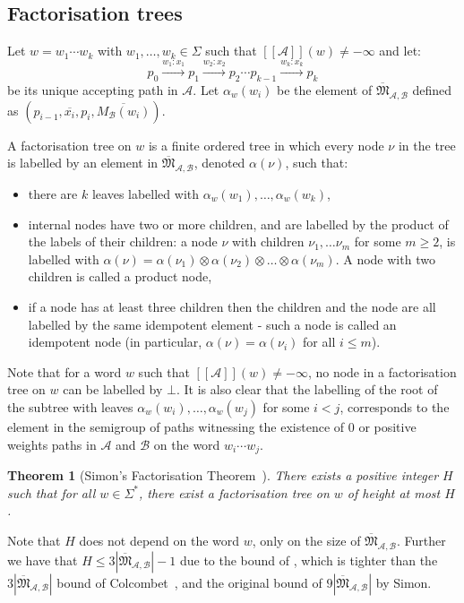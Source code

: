 \documentclass[10pt,a4paper]{amsart}
\newtheorem{thm}{Theorem}[section]
\theoremstyle{definition}
\numberwithin{equation}{section}
\theoremstyle{remark}
\newcommand{\ideal}{\mathfrak{M}}
\newcommand{\autA}{\mathcal{A}}
\newcommand{\autB}{\mathcal{B}}
\newcommand{\brfunc}[1]{[\![#1]\!]}
\newcommand{\funcA}{\brfunc{\autA}}
\theoremstyle{remark}
\begin{document}
\subsection{Factorisation trees}
Let $w = w_1\cdots w_k$ with $w_1, \ldots, w_k \in \Sigma$ such that $\funcA(w) \neq -\infty$ and let:
$$p_0 \xrightarrow{w_1:x_1} p_1 \xrightarrow{w_2:x_2} p_2 \dotsm p_{k-1}\xrightarrow{w_{k}:x_k} p_k$$ 
be its unique accepting path in $\autA$. Let $\alpha_w(w_i)$ be the element of $\overline{\ideal}_{\autA,\autB}$ defined as $(p_{i-1},\overline{x_i},p_i,\overline{M_\autB(w_i)})$.

A factorisation tree on $w$ is a finite ordered tree in which every node $\nu$ in the tree is labelled by an element in $\overline{\ideal}_{\autA,\autB}$, denoted $\alpha(\nu)$, such that:
\begin{itemize}
\item there are $k$ leaves labelled with $\alpha_w(w_1), \ldots, \alpha_w(w_k)$, 
\item internal nodes have two or more children, and are labelled by the product of the labels of their children: a node $\nu$ with children $\nu_1,\dots \nu_m$ for some $m\ge 2$, is labelled with $\alpha(\nu) = \alpha(\nu_1)\otimes \alpha(\nu_2) \otimes \dots \otimes \alpha(\nu_m)$. A node with two children is called a product node,
\item if a node has at least three children then the children and the node are all labelled by the same idempotent element - such a node is called an idempotent node (in particular, $\alpha(\nu) = \alpha(\nu_i)$ for all $i\le m$).
\end{itemize}

Note that for a word $w$ such that $\funcA(w) \neq -\infty$, no node in a factorisation tree on $w$ can be labelled by $\bot$. It is also clear that the labelling of the root of the subtree with leaves $\alpha_w(w_i), \ldots, \alpha_w(w_j)$ for some $i<j$, corresponds to the element in the semigroup of paths witnessing the existence of $0$ or positive weights paths in $\autA$ and $\autB$ on the word $w_i \cdots w_j$.


\begin{thm}[Simon's Factorisation Theorem~\cite{Simon90}]
\label{theorem:Simon90}
There exists a positive integer $H$ such that for all $w\in\Sigma^*$, there exist a factorisation tree on $w$ of height at most $H$.
\end{thm}

Note that $H$ does not depend on the word $w$, only on the size of $\overline{\ideal}_{\autA,\autB}$. Further we have that $H \le 3|\overline{\ideal}_{\autA,\autB}|-1$ due to the bound of \cite{Kufleitner08}, which is tighter than the $3|\overline{\ideal}_{\autA,\autB}|$ bound of Colcombet~\cite{Colcombet07}, and the original bound of $9|\overline{\ideal}_{\autA,\autB}|$  by Simon.
\end{document}

